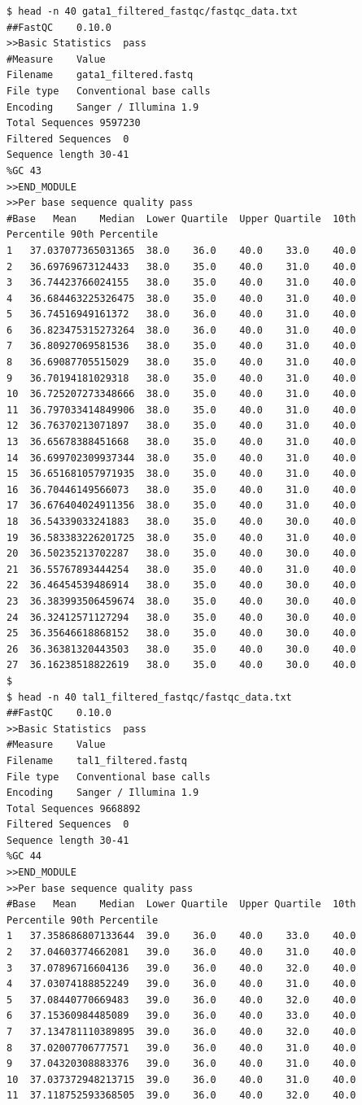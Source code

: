 \documentclass[11pt]{article} %
\begin{document}
\begin{lstlisting}
$ head -n 40 gata1_filtered_fastqc/fastqc_data.txt 
##FastQC	0.10.0
>>Basic Statistics	pass
#Measure	Value	
Filename	gata1_filtered.fastq	
File type	Conventional base calls	
Encoding	Sanger / Illumina 1.9	
Total Sequences	9597230	
Filtered Sequences	0	
Sequence length	30-41	
%GC	43	
>>END_MODULE
>>Per base sequence quality	pass
#Base	Mean	Median	Lower Quartile	Upper Quartile	10th Percentile	90th Percentile
1	37.037077365031365	38.0	36.0	40.0	33.0	40.0
2	36.69769673124433	38.0	35.0	40.0	31.0	40.0
3	36.74423766024155	38.0	35.0	40.0	31.0	40.0
4	36.684463225326475	38.0	35.0	40.0	31.0	40.0
5	36.74516949161372	38.0	36.0	40.0	31.0	40.0
6	36.823475315273264	38.0	36.0	40.0	31.0	40.0
7	36.80927069581536	38.0	35.0	40.0	31.0	40.0
8	36.69087705515029	38.0	35.0	40.0	31.0	40.0
9	36.70194181029318	38.0	35.0	40.0	31.0	40.0
10	36.725207273348666	38.0	35.0	40.0	31.0	40.0
11	36.797033414849906	38.0	35.0	40.0	31.0	40.0
12	36.76370213071897	38.0	35.0	40.0	31.0	40.0
13	36.65678388451668	38.0	35.0	40.0	31.0	40.0
14	36.699702309937344	38.0	35.0	40.0	31.0	40.0
15	36.651681057971935	38.0	35.0	40.0	31.0	40.0
16	36.70446149566073	38.0	35.0	40.0	31.0	40.0
17	36.676404024911356	38.0	35.0	40.0	31.0	40.0
18	36.54339033241883	38.0	35.0	40.0	30.0	40.0
19	36.583383226201725	38.0	35.0	40.0	31.0	40.0
20	36.50235213702287	38.0	35.0	40.0	30.0	40.0
21	36.55767893444254	38.0	35.0	40.0	31.0	40.0
22	36.46454539486914	38.0	35.0	40.0	30.0	40.0
23	36.383993506459674	38.0	35.0	40.0	30.0	40.0
24	36.32412571127294	38.0	35.0	40.0	30.0	40.0
25	36.35646618868152	38.0	35.0	40.0	30.0	40.0
26	36.36381320443503	38.0	35.0	40.0	30.0	40.0
27	36.16238518822619	38.0	35.0	40.0	30.0	40.0
$
$ head -n 40 tal1_filtered_fastqc/fastqc_data.txt 
##FastQC	0.10.0
>>Basic Statistics	pass
#Measure	Value	
Filename	tal1_filtered.fastq	
File type	Conventional base calls	
Encoding	Sanger / Illumina 1.9	
Total Sequences	9668892	
Filtered Sequences	0	
Sequence length	30-41	
%GC	44	
>>END_MODULE
>>Per base sequence quality	pass
#Base	Mean	Median	Lower Quartile	Upper Quartile	10th Percentile	90th Percentile
1	37.358686807133644	39.0	36.0	40.0	33.0	40.0
2	37.04603774662081	39.0	36.0	40.0	31.0	40.0
3	37.07896716604136	39.0	36.0	40.0	32.0	40.0
4	37.03074188852249	39.0	36.0	40.0	31.0	40.0
5	37.08440770669483	39.0	36.0	40.0	32.0	40.0
6	37.15360984485089	39.0	36.0	40.0	33.0	40.0
7	37.134781110389895	39.0	36.0	40.0	32.0	40.0
8	37.02007706777571	39.0	36.0	40.0	31.0	40.0
9	37.04320308883376	39.0	36.0	40.0	31.0	40.0
10	37.037372948213715	39.0	36.0	40.0	31.0	40.0
11	37.118752593368505	39.0	36.0	40.0	32.0	40.0

\end{lstlisting}
\end{document}
